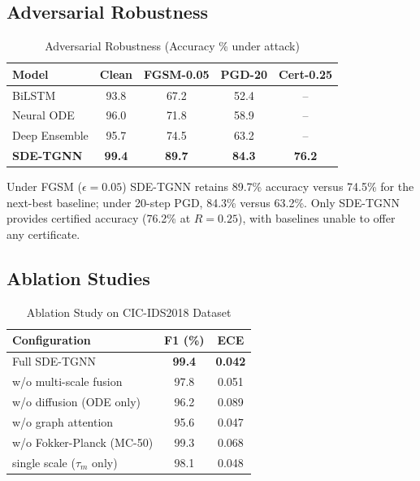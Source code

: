 \documentclass[10pt,journal,compsoc]{IEEEtran}
\begin{document}
\vspace{-0.2cm}
\subsection{Adversarial Robustness}

\begin{table}[!t]
\centering
\caption{Adversarial Robustness (Accuracy \% under attack)}
\label{tab:adversarial}
\small
\begin{tabular}{@{}lcccc@{}}
\toprule
\textbf{Model} & \textbf{Clean} & \textbf{FGSM-0.05} & \textbf{PGD-20} & \textbf{Cert-0.25} \\
\midrule
BiLSTM & 93.8 & 67.2 & 52.4 & -- \\
Neural ODE & 96.0 & 71.8 & 58.9 & -- \\
Deep Ensemble & 95.7 & 74.5 & 63.2 & -- \\
\textbf{SDE-TGNN} & \textbf{99.4} & \textbf{89.7} & \textbf{84.3} & \textbf{76.2} \\
\bottomrule
\end{tabular}
\end{table}

Under FGSM ($\epsilon{=}0.05$) SDE-TGNN retains 89.7\% accuracy versus 74.5\% for the next-best baseline; under 20-step PGD, 84.3\% versus 63.2\%. Only SDE-TGNN provides certified accuracy (76.2\% at $R{=}0.25$), with baselines unable to offer any certificate.

\vspace{-0.2cm}
\subsection{Ablation Studies}

\begin{table}[!t]
\centering
\caption{Ablation Study on CIC-IDS2018 Dataset}
\label{tab:ablation}
\small
\begin{tabular}{@{}lcc@{}}
\toprule
\textbf{Configuration} & \textbf{F1 (\%)} & \textbf{ECE} \\
\midrule
Full SDE-TGNN & \textbf{99.4} & \textbf{0.042} \\
\quad w/o multi-scale fusion & 97.8 & 0.051 \\
\quad w/o diffusion (ODE only) & 96.2 & 0.089 \\
\quad w/o graph attention & 95.6 & 0.047 \\
\quad w/o Fokker-Planck (MC-50) & 99.3 & 0.068 \\
\quad single scale ($\tau_m$ only) & 98.1 & 0.048 \\
\bottomrule
\end{tabular}
\end{table}
\end{document}
